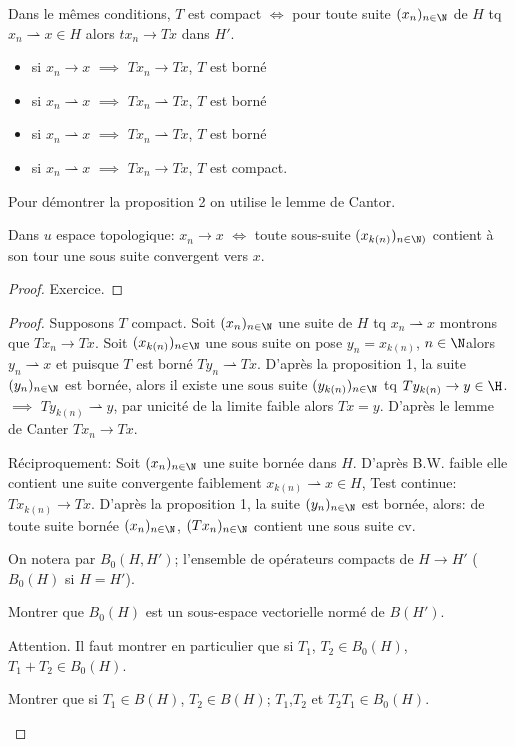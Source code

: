 \begin{proposition}
	Dans le mêmes conditions, $T$ est compact $\iff$ pour toute suite $(x_n)_{n\in \N}$ de $H$ tq $x_n\rightharpoonup x\in H$ alors $tx_n\to Tx$ dans $H'$.
\end{proposition}
\begin{remark}
	\begin{itemize}
		\item si $x_n\to x$ $\implies$ $Tx_n\to Tx$, $T$ est borné
		\item si $x_n\rightharpoonup x$ $\implies$ $Tx_n\rightharpoonup Tx$, $T$ est borné
		\item si $x_n\rightharpoonup x$ $\implies$ $Tx_n\rightharpoonup Tx$, $T$ est borné
		\item si $x_n\rightharpoonup x$ $\implies$ $Tx_n\to Tx$, $T$ est compact.
	\end{itemize}
\end{remark}
Pour démontrer la proposition 2 on utilise le lemme de Cantor.
\begin{lemme}
	Dans $u$ espace topologique: $x_n\to x$ $\iff$ toute sous-suite $(x_{k(n)})_{n\in\N)}$ contient à son tour une sous suite convergent vers $x$.
\end{lemme}
\begin{proof}
	Exercice.
\end{proof}
\begin{proof}
	Supposons $T$ compact. Soit $(x_n)_{n\in\N}$ une suite de $H$ tq $x_n\rightharpoonup x$ montrons que $Tx_n\to Tx$. Soit $(x_{k(n)})_{n\in\N}$ une sous suite on pose $y_n=x_{k(n)}$, $n\in\N $alors $y_n\rightharpoonup x$ et puisque $T$ est borné $Ty_n\rightharpoonup Tx$. D'après la proposition 1, la suite $(y_n)_{n\in\N}$ est bornée, alors il existe une sous suite $(y_{k(n)})_{n\in\N}$ tq $Ty_{k(n)}\to y\in\H$. $\implies$ $Ty_{k(n)}\rightharpoonup y$, par unicité de la limite faible alors $Tx=y$. D'après le lemme de Canter $Tx_n\to Tx$.
	
	Réciproquement: Soit $(x_n)_{n\in\N}$ une suite bornée dans $H$. D'après B.W. faible elle contient une suite convergente faiblement $x_{k(n)}\rightharpoonup x\in H$, Test continue: $Tx_{k(n)}\to Tx$. D'après la proposition 1, la suite $(y_n)_{n\in\N}$ est bornée, alors: de toute suite bornée $(x_n)_{n\in\N}$, $(Tx_n)_{n\in\N}$ contient une sous suite cv.
	
	On notera par $B_0(H,H')$; l'ensemble de opérateurs compacts de $H\rightarrow H'$ ($B_0(H)$ si $H=H'$).
	\begin{exercise}
		Montrer que $B_0(H)$ est un sous-espace vectorielle normé de $B(H')$.
	\end{exercise}

	Attention. Il faut montrer en particulier que si $T_1$, $T_2\in B_0(H)$, $T_1+T_2\in B_0(H)$.
	\begin{exercise}
		Montrer que si $T_1\in B(H)$, $T_2\in B(H)$; $T_1$,$T_2$ et $T_2T_1\in B_0(H)$.
	\end{exercise}
\end{proof}
